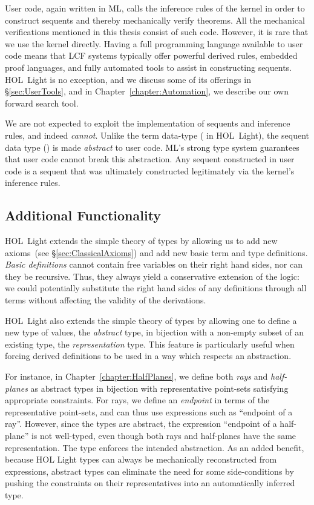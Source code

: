 User code, again written in ML, calls the inference rules of the kernel in order to construct sequents and thereby mechanically verify theorems. All the mechanical verifications mentioned in this thesis consist of such code. However, it is rare that we use the kernel directly. Having a full programming language available to user code means that LCF systems typically offer powerful derived rules, embedded proof languages, and fully automated tools to assist in constructing sequents. HOL~Light is no exception, and we discuss some of its offerings in \S\ref{sec:UserTools}, and in Chapter~\ref{chapter:Automation}, we describe our own forward search tool.

We are not expected to exploit the implementation of sequents and inference rules, and indeed \emph{cannot}. Unlike the term data-type ( in HOL~Light), the sequent data type () is made \emph{abstract} to user code. ML's strong type system guarantees that user code cannot break this abstraction. Any sequent constructed in user code is a sequent that was ultimately constructed legitimately via the kernel's inference rules.

\subsection{Additional Functionality}
HOL~Light extends the simple theory of types by allowing us to add new axioms~(see \S\ref{sec:ClassicalAxioms}) and add new basic term and type definitions. \emph{Basic definitions} cannot contain free variables on their right hand sides, nor can they be recursive. Thus, they always yield a conservative extension of the logic: we could potentially substitute the right hand sides of any definitions through all terms without affecting the validity of the derivations.

HOL~Light also extends the simple theory of types by allowing one to define a new type of values, the \emph{abstract} type, in bijection with a non-empty subset of an existing type, the \emph{representation} type. This feature is particularly useful when forcing derived definitions to be used in a way which respects an abstraction.

For instance, in Chapter~\ref{chapter:HalfPlanes}, we define both \emph{rays} and \emph{half-planes} as abstract types in bijection with representative point-sets satisfying appropriate constraints. For rays, we define an \emph{endpoint} in terms of the representative point-sets, and can thus use expressions such as ``endpoint of a ray''. However, since the types are abstract, the expression ``endpoint of a half-plane'' is not well-typed, even though both rays and half-planes have the same representation. The type  enforces the intended abstraction. As an added benefit, because HOL Light types can always be mechanically reconstructed from expressions, abstract types can eliminate the need for some side-conditions by pushing the constraints on their representatives into an automatically inferred type.

